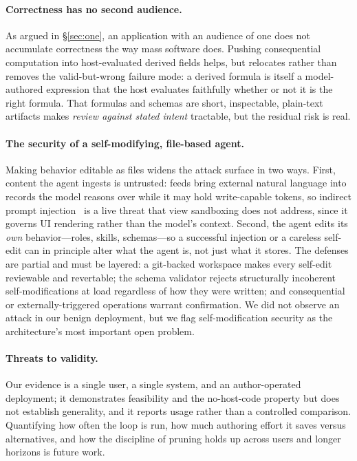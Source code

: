 \documentclass[11pt]{article}
\begin{document}
\paragraph{Correctness has no second audience.}
As argued in \S\ref{sec:one}, an application with an audience of one does not
accumulate correctness the way mass software does. Pushing consequential computation
into host-evaluated derived fields helps, but relocates rather than removes the
valid-but-wrong failure mode: a derived formula is itself a model-authored
expression that the host evaluates faithfully whether or not it is the right formula.
That formulas and schemas are short, inspectable, plain-text artifacts makes
\emph{review against stated intent} tractable, but the residual risk is real.

\paragraph{The security of a self-modifying, file-based agent.}
Making behavior editable as files widens the attack surface in two ways. First,
content the agent ingests is untrusted: feeds bring external natural language into
records the model reasons over while it may hold write-capable tokens, so indirect
prompt injection~\citep{greshake2023injection} is a live threat that view sandboxing
does not address, since it governs UI rendering rather than the model's context.
Second, the agent edits its \emph{own} behavior---roles, skills, schemas---so a
successful injection or a careless self-edit can in principle alter what the agent is,
not just what it stores. The defenses are partial and must be layered: a
git-backed workspace makes every self-edit reviewable and revertable; the schema
validator rejects structurally incoherent self-modifications at load regardless of
how they were written; and consequential or externally-triggered operations warrant
confirmation. We did not observe an attack in our benign deployment, but we flag
self-modification security as the architecture's most important open problem.

\paragraph{Threats to validity.}
Our evidence is a single user, a single system, and an author-operated deployment;
it demonstrates feasibility and the no-host-code property but does not establish
generality, and it reports usage rather than a controlled comparison. Quantifying
how often the loop is run, how much authoring effort it saves versus alternatives,
and how the discipline of pruning holds up across users and longer horizons is
future work.
\end{document}
